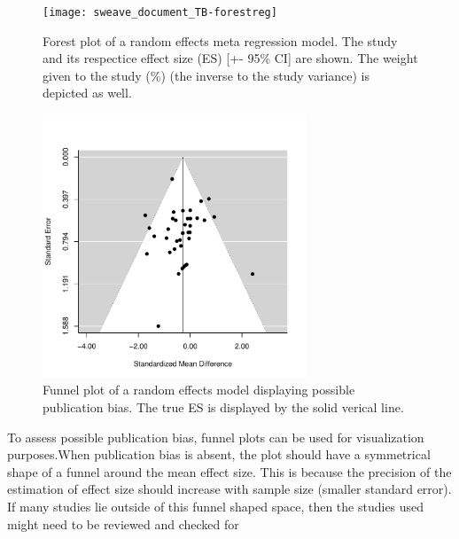 \documentclass[11pt, a4paper]{article}
\begin{document}
\begin{figure}[h!]
\captionsetup{width=0.6\textwidth}
\centering
\texttt{[image: sweave\_document\_TB-forestreg]}
\caption{Forest plot of a random effects meta regression model. The study and its respectice effect size (ES) [+- 95\% CI] are shown. The weight given to the study (\%) (the inverse to the study variance) is depicted as well.}
\label{fig:forestplotreg}
\end{figure}




\begin{figure} [h!]
\captionsetup{width=0.6\textwidth}
\centering
\includegraphics[width=0.7\textwidth]{sweave_document_TB-funnelplot}
\caption{Funnel plot of a random effects model displaying possible publication bias. The true ES is displayed by the solid verical line.}
\end{figure}

To assess possible publication bias, funnel plots can be used for visualization purposes.When publication bias is absent, the plot should have a symmetrical shape of a funnel around the mean effect size. This is because the precision of the estimation of effect size should increase with sample size (smaller standard error). If many studies lie outside of this funnel shaped space, then the studies used might need to be reviewed and checked for  
\bigskip

\end{document}
